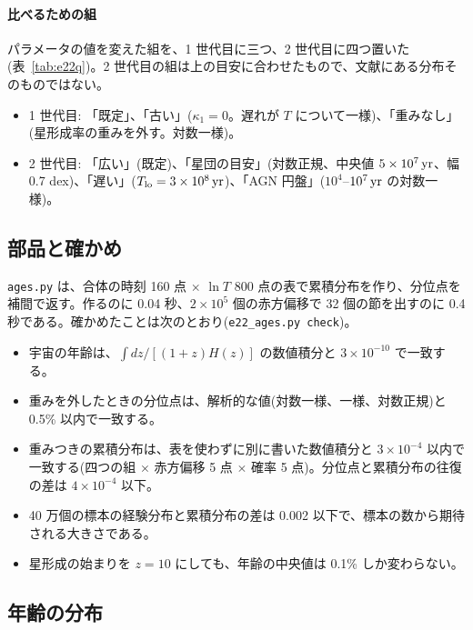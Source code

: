 \paragraph{比べるための組}
パラメータの値を変えた組を、1 世代目に三つ、2 世代目に四つ置いた(表~\ref{tab:e22q})。2 世代目の組は上の目安に合わせたもので、文献にある分布そのものではない。
\begin{itemize}
\item 1 世代目: 「既定」、「古い」($\kappa_1=0$。遅れが $T$ について一様)、「重みなし」(星形成率の重みを外す。対数一様)。
\item 2 世代目: 「広い」(既定)、「星団の目安」(対数正規、中央値 $5\times10^7\,\mathrm{yr}$、幅 0.7 dex)、「遅い」($T_\mathrm{lo}=3\times10^8\,\mathrm{yr}$)、「AGN 円盤」($10^4$--$10^7\,\mathrm{yr}$ の対数一様)。
\end{itemize}

\subsection{部品と確かめ}

\texttt{ages.py} は、合体の時刻 160 点 $\times$ $\ln T$ 800 点の表で累積分布を作り、分位点を補間で返す。作るのに 0.04 秒、$2\times10^5$ 個の赤方偏移で 32 個の節を出すのに 0.4 秒である。確かめたことは次のとおり(\texttt{e22\_ages.py check})。
\begin{itemize}
\item 宇宙の年齢は、$\int dz/[(1+z)H(z)]$ の数値積分と $3\times10^{-10}$ で一致する。
\item 重みを外したときの分位点は、解析的な値(対数一様、一様、対数正規)と 0.5\% 以内で一致する。
\item 重みつきの累積分布は、表を使わずに別に書いた数値積分と $3\times10^{-4}$ 以内で一致する(四つの組 $\times$ 赤方偏移 5 点 $\times$ 確率 5 点)。分位点と累積分布の往復の差は $4\times10^{-4}$ 以下。
\item 40 万個の標本の経験分布と累積分布の差は 0.002 以下で、標本の数から期待される大きさである。
\item 星形成の始まりを $z=10$ にしても、年齢の中央値は 0.1\% しか変わらない。
\end{itemize}

\subsection{年齢の分布}

